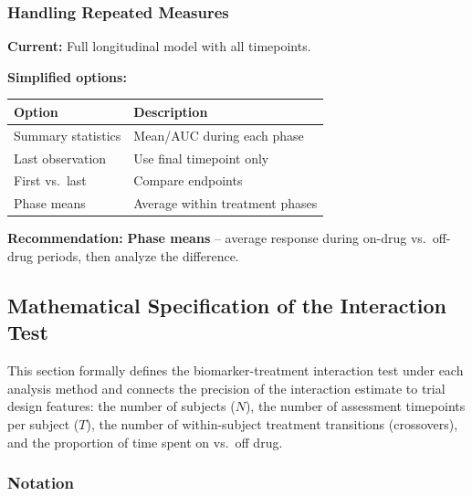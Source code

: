 \documentclass[11pt]{article}
\begin{document}
\subsubsection{Handling Repeated Measures}

\textbf{Current:} Full longitudinal model with all timepoints.

\textbf{Simplified options:}

\begin{table}[h]
\centering
\begin{tabular}{@{}ll@{}}
\toprule
Option & Description \\
\midrule
Summary statistics & Mean/AUC during each phase \\
Last observation & Use final timepoint only \\
First vs.\ last & Compare endpoints \\
Phase means & Average within treatment phases \\
\bottomrule
\end{tabular}
\end{table}

\textbf{Recommendation:} \textbf{Phase means} -- average response during
on-drug vs.\ off-drug periods, then analyze the difference.


\subsection{Mathematical Specification of the Interaction Test}
\label{sec:mathspec}

This section formally defines the biomarker-treatment interaction test
under each analysis method and connects the precision of the interaction
estimate to trial design features: the number of subjects ($N$), the
number of assessment timepoints per subject ($T$), the number of
within-subject treatment transitions (crossovers), and the proportion of
time spent on vs.\ off drug.

\subsubsection{Notation}
\end{document}
